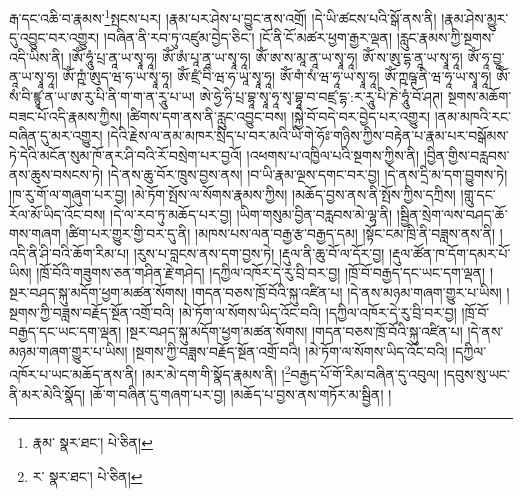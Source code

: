 རྒ་དང་འཆི་བ་རྣམས་\footnote{རྣམ་  སྣར་ཐང་།  པེ་ཅིན། }སྤངས་པར། །རྣམ་པར་ཤེས་པ་བྱུང་ནས་འགྲོ། །དེ་ཡི་ཚངས་པའི་སྒོ་ནས་ནི། །རྣམ་ཤེས་མྱུར་དུ་འབྱུང་བར་འགྱུར། །བཞིན་ནི་རབ་ཏུ་འཛུམ་བྱེད་ཅིང་། །ངོ་ནི་ངོ་མཚར་ཕྱག་རྒྱར་ལྡན། །རླུང་རྣམས་ཀྱི་སྔགས་འདི་ཡིས་ནི། །ཨོཾ་ཧཱུཾ་པྲ་ནཱ་ཡ་སྭཱ་ཧཱ། ཨོཾ་ཨཾ་པཱ་ནཱ་ཡ་སྭཱ་ཧཱ། ཨོཾ་ཨ་ས་མཱ་ནཱ་ཡ་སྭཱ་ཧཱ། ཨོཾ་ས་ཨུ་དྷ་ནཱ་ཡ་སྭཱ་ཧཱ། ཨོཾ་ཧཱ་བྱཱ་ནཱ་ཡ་སྭཱ་ཧཱ། ཨོཾ་ཀྵཾ་ཨུད་ཝ་ཧ་ཡ་སྭཱ་ཧཱ། ཨོཾ་ཛྲཾ་བི་ཝ་ཧ་ཡཱ་སྭཱ་ཧཱ། ཨོཾ་གཾ་སཾ་ཝ་ཧཱ་ཡ་སྭཱ་ཧཱ། ཨོཾ་ཀྵཥྚ་ནི་ཝ་ཧཱ་ཡ་སྭཱ་ཧཱ། ཨོཾ་སཾ་བི་ཛྙཱ་ན་ཡ་ཨ་རུ་པི་ནི་ག་ག་ན་རཱུ་པ་ཡ། ཨེ་ཧྱེ་ཧི་པྲ་བྷཱ་སྭཱ་ཧཱ་སྭ་བྷཱ་བ་བཛྲ་དྷ་:ར་རཱུ་པི་ཎེ་ཧཱུཾ་བོ་ཤཊ། སྔགས་མཆོག་བཟང་པོ་འདི་རྣམས་ཀྱིས། །ཚིགས་དག་ནས་ནི་རླུང་འབྱུང་བས། །སྐྱེ་བོ་བདེ་བར་བྱེད་པར་འགྱུར། །ནམ་མཁའི་རང་བཞིན་དུ་མར་འགྱུར། །དེའི་རྗེས་ལ་ནམ་མཁར་སྲིད་པ་བར་མའི་ཡི་གེ་ཧོཿ་གཉིས་ཀྱིས་བརྟེན་པ་རྣམ་པར་བསྒོམས་ཏེ་དེའི་མངོན་སུམ་ཁོ་ནར་ཤི་བའི་རོ་བསྲེག་པར་བྱའོ། །འཕགས་པ་འཁྱིལ་པའི་སྔགས་ཀྱིས་ནི། །བྱིན་གྱིས་བརླབས་ནས་ཆུས་བསངས་ཏེ། །དེ་ནས་ཆུ་བོར་ཁྲུས་བྱས་ནས། །བ་ཡི་རྣམ་ལྔས་དགང་བར་བྱ། །དེ་ནས་དྲི་མ་དག་བྱུགས་ཏེ། །ཁ་རུ་གོ་ལ་གཞུག་པར་བྱ། །མེ་ཏོག་སྤོས་ལ་སོགས་རྣམས་ཀྱིས། །མཆོད་བྱས་ནས་ནི་སྤོས་ཀྱིས་དཀྲིས། །གླུ་དང་རོལ་མོ་ཡིད་འོང་བས། །དེ་ལ་རབ་ཏུ་མཆོད་པར་བྱ། །ཡིག་གསུམ་བྱིན་བརླབས་མེ་ལྷ་ནི། །སྦྱིན་སྲེག་ལས་བཤད་ཆོ་གས་གཞག །ཚིག་པར་གྱུར་གྱི་བར་དུ་ནི། །མཁས་པས་ལན་བརྒྱ་རྩ་བརྒྱད་དམ། །སྟོང་ངམ་ཁྲི་ནི་བཟླས་ནས་ནི། །འདི་ནི་ཤི་བའི་ཆོག་རིམ་པ། །རུས་པ་བླངས་ནས་དག་བྱས་ཏེ། །རྡུལ་ནི་ཆུ་བོ་ལ་དོར་བྱ། །རྡུལ་ཚོན་ཁ་དོག་དམར་པོ་ཡིས། །ཁྲོ་བོའི་གཟུགས་ཅན་གཤིན་རྗེ་གཤེད། །དཀྱིལ་འཁོར་དེ་རུ་བྲི་བར་བྱ། །ཁྲོ་བོ་བརྒྱད་དང་ཡང་དག་ལྡན། །སྔར་བཤད་སྐུ་མདོག་ཕྱག་མཚན་སོགས། །གདན་བཅས་ཁྲོ་བོའི་སྐུ་འཛིན་པ། །དེ་ནས་མཉམ་གཞག་གྱུར་པ་ཡིས། །སྔགས་ཀྱི་བཟླས་བརྗོད་སྔོན་འགྲོ་བའི། །མེ་ཏོག་ལ་སོགས་ཡིད་འོང་བའི། །དཀྱིལ་འཁོར་དེ་རུ་བྲི་བར་བྱ། །ཁྲོ་བོ་བརྒྱད་དང་ཡང་དག་ལྡན། །སྔར་བཤད་སྐུ་མདོག་ཕྱག་མཚན་སོགས། །གདན་བཅས་ཁྲོ་བོའི་སྐུ་འཛིན་པ། །དེ་ནས་མཉམ་གཞག་གྱུར་པ་ཡིས། །སྔགས་ཀྱི་བཟླས་བརྗོད་སྔོན་འགྲོ་བའི། །མེ་ཏོག་ལ་སོགས་ཡིད་འོང་བའི། །དཀྱིལ་འཁོར་པ་ཡང་མཆོད་ནས་ནི། །མར་མེ་དག་གི་སྣོད་རྣམས་ནི། །\footnote{ར་  སྣར་ཐང་།  པེ་ཅིན། }བརྒྱད་པོ་གོ་རིམ་བཞིན་དུ་འབུལ། །དབུས་སུ་ཡང་ནི་མར་མེའི་སྣོད། །ཆོ་ག་བཞིན་དུ་གཞག་པར་བྱ། །མཆོད་པ་བྱས་ནས་གཏོར་མ་སྦྱིན། །
